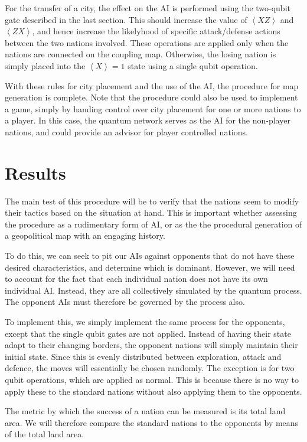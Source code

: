 \documentclass[conference]{IEEEtran}
\begin{document}
For the transfer of a city, the effect on the AI is performed using the two-qubit gate described in the last section. This should increase the value of $\left\langle XZ\right\rangle$ and $\left\langle ZX\right\rangle$, and hence increase the likelyhood of specific attack/defense actions between the two nations involved. These operations are applied only when the nations are connected on the coupling map. Otherwise, the losing nation is simply placed into the $\left\langle X\right\rangle=1$ state using a single qubit operation.

With these rules for city placement and the use of the AI, the procedure for map generation is complete. Note that the procedure could also be used to implement a game, simply by handing control over city placement for one or more nations to a player. In this case, the quantum network serves as the AI for the non-player nations, and could provide an advisor for player controlled nations.

\section{Results}


The main test of this procedure will be to verify that the nations seem to modify their tactics based on the situation at hand. This is important whether assessing the procedure as a rudimentary form of AI, or as the the procedural generation of a geopolitical map with an engaging history.

To do this, we can seek to pit our AIs against opponents that do not have these desired characteristics, and determine which is dominant. However, we will need to account for the fact that each individual nation does not have its own individual AI. Instead, they are all collectively simulated by the quantum process. The opponent AIs must therefore be governed by the process also.

To implement this, we simply implement the same process for the opponents, except that the single qubit gates are not applied. Instead of having their state adapt to their changing borders, the opponent nations will simply maintain their initial state. Since this is evenly distributed between exploration, attack and defence, the moves will essentially be chosen randomly. The exception is for two qubit operations, which are applied as normal. This is because there is no way to apply these to the standard nations without also applying them to the opponents.

The metric by which the success of a nation can be measured is its total land area. We will therefore compare the standard nations to the opponents by means of the total land area.
\end{document}
